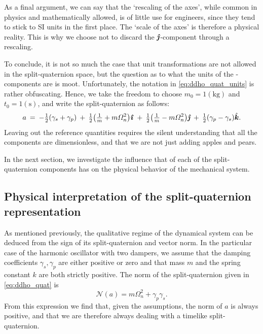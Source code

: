 As a final argument, we can say that the `rescaling of the axes', while common in physics and mathematically allowed, is of little use for engineers, since they tend to stick to SI units in the first place. The `scale of the axes' is therefore a physical reality. This is why we choose not to discard the \(\quatj\)-component through a rescaling.

To conclude, it is not so much the case that unit transformations are not allowed in the split-quaternion space, but the question as to what the units of the \quatj-components are is moot. Unfortunately, the notation in \cref{eq:ddho_quat_units} is rather obfuscating. Hence, we take the freedom to choose \(m_0 = 1 (\si{\kilogram})\) and \(t_0 = 1 (\si{\second})\), and write the split-quaternion as follows:
\begin{equation}
    a\:=\: -\tfrac{1}{2}\qty(\gamma_s + \gamma_p)\:+\:\tfrac{1}{2}\qty(\tfrac{1}{m} + m\Omega_n^2)\quati\:+\:\tfrac{1}{2}\qty(\tfrac{1}{m} - m\Omega_n^2)\quatj\:+\:\tfrac{1}{2}\qty(\gamma_p - \gamma_s)\quatk. 
    \label{eq:ddho_quat}
\end{equation}
Leaving out the reference quantities requires the silent understanding that all the components are dimensionless, and that we are not just adding apples and pears. 

In the next section, we investigate the influence that of each of the split-quaternion components has on the physical behavior of the mechanical system.

\subsection{Physical interpretation of the split-quaternion representation}
As mentioned previously, the qualitative regime of the dynamical system can be deduced from the sign of its split-quaternion and vector norm. In the particular case of the harmonic oscillator with two dampers, we assume that the damping coefficients \(\gamma_s, \gamma_p\) are either positive or zero and that mass \(m\) and the spring constant \(k\) are both strictly positive. The norm of the split-quaternion given in \cref{eq:ddho_quat} is
\begin{equation}
     \mathscr{N}(a) = m \Omega_n^2 + \gamma_p \gamma_s.
\end{equation}
From this expression we find that, given the assumptions, the norm of \(a\) is always positive, and that we are therefore always dealing with a timelike split-quaternion. 

